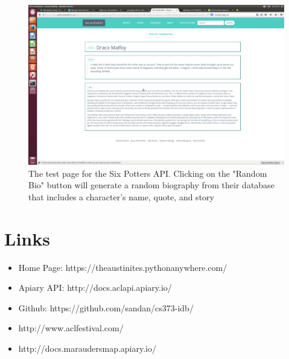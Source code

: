 \documentclass[12pt,english]{scrartcl}
\begin{document}
\begin{figure}
\includegraphics[width=\textwidth]{pottersAPI.png}
 \caption{The test page for the Six Potters API. Clicking on the "Random Bio" button will generate a random biography from their database
 that includes a character's name, quote, and story}
\end{figure}

\section{Links}

\begin{itemize}
 \item Home Page: https://theaustinites.pythonanywhere.com/
 \item Apiary API: http://docs.aclapi.apiary.io/
 \item Github: https://github.com/sandan/cs373-idb/
 \item http://www.aclfestival.com/
 \item http://docs.maraudersmap.apiary.io/
\end{itemize}
\end{document}
